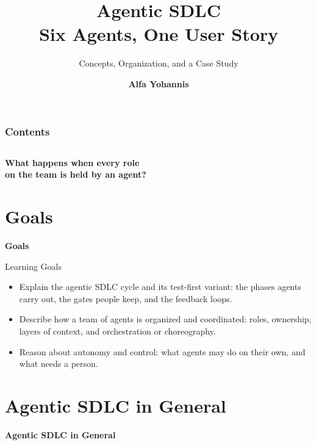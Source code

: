 \documentclass[aspectratio=169, table, 12pt]{beamer}
\title{\Huge Agentic SDLC\\ \vspace{10pt} \LARGE Six Agents, One User Story}
\subtitle{Concepts, Organization, and a Case Study}
\author{\textbf{Alfa Yohannis}}
\begin{document}
\frame{\titlepage}

\begin{frame}
  \frametitle{Contents}
  \vspace{14pt}
  \begin{columns}[t]
    {\small\tableofcontents[sections={1-4}]}

    {\small\tableofcontents[sections={5-8}]}
  \end{columns}
\end{frame}

\begin{frame}{\hfill}
  \centering
  \Huge{\textbf{What happens when every role\\on the team is held by an agent?}}
\end{frame}

\section{Goals}

\begin{frame}{\hfill}
  \centering
  \Huge{\textbf{Goals}}
\end{frame}

\begin{frame}{{\Large Learning Goals}}
  \vspace{12pt}
  \begin{itemize}
    \item Explain the agentic SDLC cycle and its test-first variant: the
          phases agents carry out, the gates people keep, and the feedback
          loops.
    \item Describe how a team of agents is organized and coordinated: roles,
          ownership, layers of context, and orchestration or choreography.
    \item Reason about autonomy and control: what agents may do on their own,
          and what needs a person.
  \end{itemize}
\end{frame}

\section{Agentic SDLC in General}

\begin{frame}{\hfill}
  \centering
  \Huge{\textbf{Agentic SDLC in General}}
\end{frame}
\end{document}
